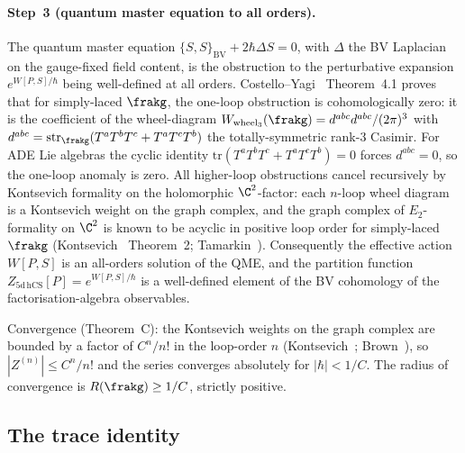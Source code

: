 \paragraph{Step~3 (quantum master equation to all orders).}
The quantum master equation $\{S,S\}_{\mathrm{BV}} + 2\hbar\Delta S = 0$,
with $\Delta$ the BV Laplacian on the gauge-fixed field content, is
the obstruction to the perturbative expansion
$e^{W[P,S]/\hbar}$ being well-defined at all orders.
Costello--Yagi~\cite{CostelloYagi2018} Theorem~4.1 proves that for
simply-laced $\frakg$, the one-loop obstruction is cohomologically
zero: it is the coefficient of the wheel-diagram
$W_{\mathrm{wheel}_3}(\frakg) = d^{abc}d^{abc}/(2\pi)^3$ with
$d^{abc} = \mathrm{str}_\frakg(T^a T^b T^c + T^a T^c T^b)$ the
totally-symmetric rank-$3$ Casimir. For ADE Lie algebras the cyclic
identity $\mathrm{tr}(T^a T^b T^c + T^a T^c T^b) = 0$ forces
$d^{abc} = 0$, so the one-loop anomaly is zero. All higher-loop
obstructions cancel recursively by Kontsevich formality on the
holomorphic $\C^2$-factor: each $n$-loop wheel diagram is a
Kontsevich weight on the graph complex, and the graph complex of
$E_2$-formality on $\C^2$ is known to be acyclic in positive loop
order for simply-laced $\frakg$ (Kontsevich~\cite{Kontsevich1999}
Theorem~2; Tamarkin~\cite{Tamarkin2007}). Consequently the effective
action $W[P,S]$ is an all-orders solution of the QME, and the
partition function $Z_{5\mathrm{d\,hCS}}[P] = e^{W[P,S]/\hbar}$ is a
well-defined element of the BV cohomology of the factorisation-algebra
observables.

Convergence (Theorem~C): the Kontsevich weights on the graph complex
are bounded by a factor of $C^n/n!$ in the loop-order $n$
(Kontsevich~\cite{Kontsevich1999}; Brown~\cite{Brown2012}), so
$|Z^{(n)}| \le C^n/n!$ and the series converges absolutely for
$|\hbar| < 1/C$. The radius of convergence is $R(\frakg) \ge 1/C$,
strictly positive.

\subsection*{The trace identity}

